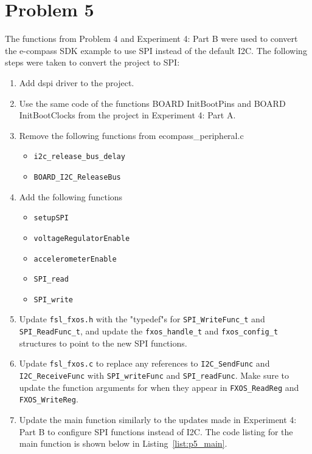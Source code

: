 \section*{Problem 5}
The functions from Problem 4 and Experiment 4: Part B were used to convert the e-compass SDK example to use SPI instead of the default I2C. The following steps were taken to convert the project to SPI:
\begin{enumerate}
    \item Add dspi driver to the project.
    \item Use the same code of the functions BOARD InitBootPins and BOARD InitBootClocks from the project in Experiment 4: Part A.
    \item Remove the following functions from ecompass\_peripheral.c
    \begin{itemize}
        \item \texttt{i2c\_release\_bus\_delay}
        \item \texttt{BOARD\_I2C\_ReleaseBus}
    \end{itemize}
    \item Add the following functions
    \begin{itemize}
        \item \texttt{setupSPI}
        \item \texttt{voltageRegulatorEnable}
        \item \texttt{accelerometerEnable}
        \item \texttt{SPI\_read}
        \item \texttt{SPI\_write}
    \end{itemize}
    \item Update \texttt{fsl\_fxos.h} with the "typedef"s for \texttt{SPI\_WriteFunc\_t} and \texttt{SPI\_ReadFunc\_t}, and update the \texttt{fxos\_handle\_t} and \texttt{fxos\_config\_t} structures to point to the new SPI functions.
    \item Update \texttt{fsl\_fxos.c} to replace any references to \texttt{I2C\_SendFunc} and \texttt{I2C\_ReceiveFunc} with \texttt{SPI\_writeFunc} and \texttt{SPI\_readFunc}. Make sure to update the function arguments for when they appear in \texttt{FXOS\_ReadReg} and \texttt{FXOS\_WriteReg}.
    \item Update the main function similarly to the updates made in Experiment 4: Part B to configure SPI functions instead of I2C. The code listing for the main function is shown below in Listing~\ref{list:p5_main}.
    
\end{enumerate}
